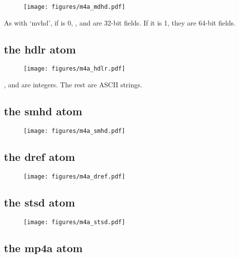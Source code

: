 \begin{figure}[h]
\texttt{[image: figures/m4a\_mdhd.pdf]}
\end{figure}
\par
\noindent
As with `mvhd', if  is 0, ,
 and  are 32-bit fields.
If it is 1, they are 64-bit fields.

\pagebreak

\subsection{the hdlr atom}

\begin{figure}[h]
\texttt{[image: figures/m4a\_hdlr.pdf]}
\end{figure}
\par
\noindent
{},  and 
are integers.  The rest are ASCII strings.

\subsection{the smhd atom}

\begin{figure}[h]
\texttt{[image: figures/m4a\_smhd.pdf]}
\end{figure}

\subsection{the dref atom}

\begin{figure}[h]
\texttt{[image: figures/m4a\_dref.pdf]}
\end{figure}

\pagebreak

\subsection{the stsd atom}

\begin{figure}[h]
\texttt{[image: figures/m4a\_stsd.pdf]}
\end{figure}

\subsection{the mp4a atom}

